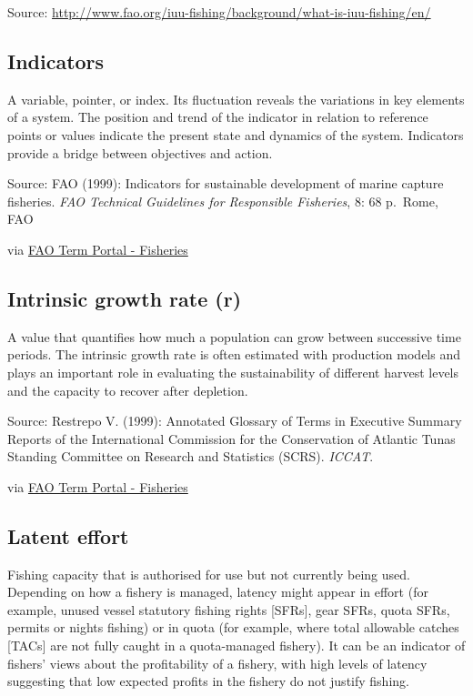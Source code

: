 \documentclass[
  11pt,
]{book}
\begin{document}
Source: \url{http://www.fao.org/iuu-fishing/background/what-is-iuu-fishing/en/}

\hypertarget{indicators}{%
\subsection{Indicators}\label{indicators}}

A variable, pointer, or index. Its fluctuation reveals the variations in key elements of a system. The position and trend of the indicator in relation to reference points or values indicate the present state and dynamics of the system. Indicators provide a bridge between objectives and action.

Source: FAO (1999): Indicators for sustainable development of marine capture fisheries. \emph{FAO Technical Guidelines for Responsible Fisheries}, 8: 68 p.~Rome, FAO

via \href{http://www.fao.org/fishery/glossary/en}{FAO Term Portal - Fisheries}

\hypertarget{intrinsic-growth-rate-r}{%
\subsection{Intrinsic growth rate (r)}\label{intrinsic-growth-rate-r}}

A value that quantifies how much a population can grow between successive time periods. The intrinsic growth rate is often estimated with production models and plays an important role in evaluating the sustainability of different harvest levels and the capacity to recover after depletion.

Source: Restrepo V. (1999): Annotated Glossary of Terms in Executive Summary Reports of the International Commission for the Conservation of Atlantic Tunas Standing Committee on Research and Statistics (SCRS). \emph{ICCAT}.

via \href{http://www.fao.org/fishery/glossary/en}{FAO Term Portal - Fisheries}

\hypertarget{latent-effort}{%
\subsection{Latent effort}\label{latent-effort}}

Fishing capacity that is authorised for use but not currently being used. Depending on how a fishery is managed, latency might appear in effort (for example, unused vessel statutory fishing rights {[}SFRs{]}, gear SFRs, quota SFRs, permits or nights fishing) or in quota (for example, where total allowable catches {[}TACs{]} are not fully caught in a quota-managed fishery). It can be an indicator of fishers' views about the profitability of a fishery, with high levels of latency suggesting that low expected profits in the fishery do not justify fishing.
\end{document}
